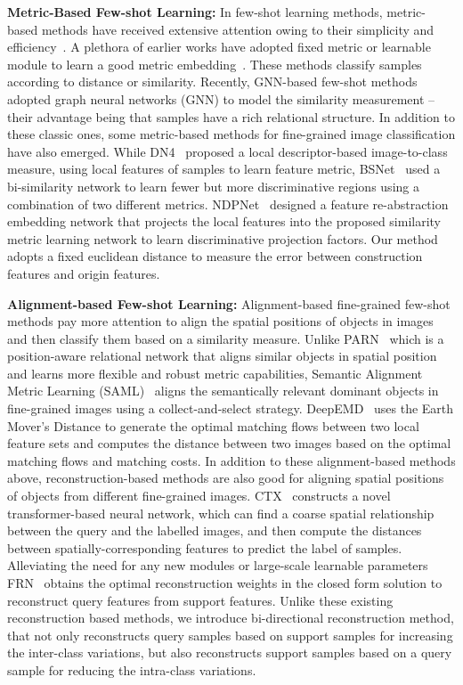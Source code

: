 \documentclass[letterpaper]{article} %
\begin{document}
\textbf{Metric-Based Few-shot Learning:}
In few-shot learning methods, metric-based methods have received extensive attention owing to their simplicity and efficiency~\cite{Li2021DeepML}.
{A plethora of earlier works have adopted fixed metric or learnable module to learn a good metric embedding~\cite{NIPS2017_cb8da676, DBLP:conf/nips/VinyalsBLKW16, 8578229}. These methods classify samples according to distance or similarity.}
Recently, GNN-based few-shot methods~\cite{garcia2018fewshot, Kim_2019_CVPR, Yang_2020_CVPR} adopted graph neural networks (GNN) to model the similarity measurement -- their advantage being that samples have a rich relational structure.
In addition to these classic ones, some metric-based methods for fine-grained image classification have also emerged.
While DN4~\cite{8953758} proposed a local descriptor-based image-to-class measure, using local features of samples to learn feature metric, {BSNet~\cite{9293172} used a bi-similarity network to learn fewer but more discriminative regions using a combination of two different metrics.}
NDPNet~\cite{Zhang2021NDPNetAN} designed a feature re-abstraction embedding network that projects the local features into the proposed similarity metric learning network to learn discriminative projection factors.
Our method adopts a fixed euclidean distance to measure the error between construction features and origin features.




\textbf{Alignment-based Few-shot Learning:}
Alignment-based fine-grained few-shot methods pay more attention to align the spatial positions of objects in images and then classify them based on a similarity measure.
Unlike PARN~\cite{Wu_2019_ICCV} which is a position-aware relational network that aligns similar objects in spatial position and learns more flexible and robust metric capabilities,
Semantic Alignment Metric Learning (SAML)~\cite{Hao2019CollectAS} aligns the semantically relevant dominant objects in fine-grained images using a collect-and-select strategy.
DeepEMD~\cite{Zhang_2020_CVPR} uses the Earth Mover's Distance to generate the optimal matching flows between two local feature sets and computes the distance between two images based on the optimal matching flows and matching costs.
In addition to these alignment-based methods above, reconstruction-based methods are also good for aligning spatial positions of objects from different fine-grained images.
CTX~\cite{NEURIPS2020_fa28c6cd} constructs a novel transformer-based neural network, which can find a coarse spatial relationship between the query and the labelled images, and then compute the distances between spatially-corresponding features to predict the label of samples.
Alleviating the need for any new modules or large-scale learnable parameters FRN~\cite{Wertheimer_2021_CVPR} obtains the optimal reconstruction weights in the closed form solution to reconstruct query features from support features.
Unlike these existing reconstruction based methods, we introduce bi-directional reconstruction method, that not only reconstructs query samples based on support samples for increasing the inter-class variations, but also reconstructs support samples based on a query sample for reducing the intra-class variations.
\end{document}
